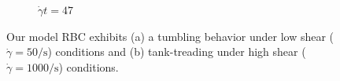\begin{figure}[tb]
\begin{subfigure}{\textwidth}
\begin{minipage}{0.2\textwidth}
        $\dot{\gamma}t = 47$
    \end{minipage}%
    \label{fig:tread}
    \end{subfigure}
    \caption{%
Our model RBC exhibits (a) a tumbling behavior under low shear ($\dot{\gamma} = 50\si{\per\second}$) conditions
and (b) tank-treading under high shear ($\dot{\gamma} = 1000\si{\per\second}$) conditions.
    }%
    \label{fig:tumble-tread}
\end{figure}

